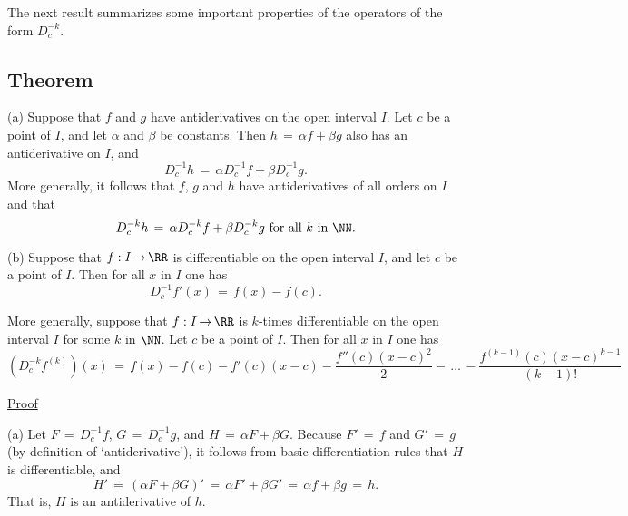 {\V
\V

        The next result summarizes some important properties of the operators of the form $D^{-k}_{c}$.

\V

            \subsection{\small{\bf Theorem}}
            \label{ThmE45.100}

\V

        (a) Suppose that $f$ and $g$ have antiderivatives on the open interval $I$.
    Let $c$ be a point of $I$, and let ${\alpha}$ and ${\beta}$ be constants.
    Then $h \,=\, {\alpha}f+{\beta}g$ also has an antiderivative on $I$, and
        \begin{displaymath}
        D^{-1}_{c} h \,=\, {\alpha}D^{-1}_{c} f + {\beta}D^{-1}_{c} g.
        \end{displaymath}
    More generally, it follows that $f$, $g$ and $h$ have antiderivatives of all orders on $I$ and that
        \begin{displaymath}
        D^{-k}_{c} h \,=\, {\alpha}D^{-k}_{c} f + {\beta}D^{-k}_{c} g \mbox{ for all $k$ in ${\NN}$}.
        \end{displaymath}

\V

        (b) Suppose that $f:I \,{\rightarrow}\, {\RR}$ is differentiable on the open interval $I$, and let $c$ be a point of $I$.
    Then for all $x$ in $I$ one has
        \begin{equation}
        \label{EqnE.86A}
        D^{-1}_{c} f'(x) \,=\, f(x)-f(c).
        \end{equation}

    More generally, suppose that $f:I \,{\rightarrow}\, {\RR}$ is $k$-times differentiable on the open interval $I$ for some $k$ in ${\NN}$.
    Let $c$ be a point of $I$.
    Then for all $x$ in $I$ one has
        \begin{equation}
        \label{EqnE.86B}
        \left(D^{-k}_{c} f^{(k)}\right)(x) \,=\, f(x) - f(c) - f'(c)(x-c) -
    \frac{f''(c)(x-c)^{2}}{2} - \,{\ldots}\,
    - \frac{f^{(k-1)}(c)(x-c)^{k-1}}{(k-1)!}
        \end{equation}

\V

        \underline{Proof}

\V

        (a) Let $F \,=\, D^{-1}_{c} f$, $G \,=\, D^{-1}_{c} g$, and $H \,=\, {\alpha}F+{\beta}G$.
    Because $F' \,=\, f$ and $G' \,=\, g$ (by definition of `antiderivative'), it follows from basic differentiation rules that $H$ is differentiable, and
        \begin{displaymath}
        H' \,=\, ({\alpha}F+{\beta}G)' \,=\, {\alpha}F'+{\beta}G' \,=\, {\alpha}f+{\beta}g \,=\, h.
        \end{displaymath}
    That is, $H$ is an antiderivative of $h$.

}
